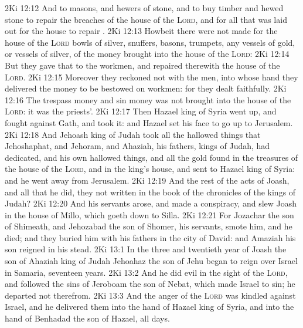 \vs 2Ki 12:12 And to masons, and hewers of stone, and to buy timber and hewed stone to repair the breaches of the house of the \textsc{Lord}, and for all that was laid out for the house to repair .
\vs 2Ki 12:13 Howbeit there were not made for the house of the \textsc{Lord} bowls of silver, snuffers, basons, trumpets, any vessels of gold, or vessels of silver, of the money  brought into the house of the \textsc{Lord}:
\vs 2Ki 12:14 But they gave that to the workmen, and repaired therewith the house of the \textsc{Lord}.
\vs 2Ki 12:15 Moreover they reckoned not with the men, into whose hand they delivered the money to be bestowed on workmen: for they dealt faithfully.
\vs 2Ki 12:16 The trespass money and sin money was not brought into the house of the \textsc{Lord}: it was the priests'.
\vs 2Ki 12:17 Then Hazael king of Syria went up, and fought against Gath, and took it: and Hazael set his face to go up to Jerusalem.
\vs 2Ki 12:18 And Jehoash king of Judah took all the hallowed things that Jehoshaphat, and Jehoram, and Ahaziah, his fathers, kings of Judah, had dedicated, and his own hallowed things, and all the gold  found in the treasures of the house of the \textsc{Lord}, and in the king's house, and sent  to Hazael king of Syria: and he went away from Jerusalem.
\vs 2Ki 12:19 And the rest of the acts of Joash, and all that he did,  they not written in the book of the chronicles of the kings of Judah?
\vs 2Ki 12:20 And his servants arose, and made a conspiracy, and slew Joash in the house of Millo, which goeth down to Silla.
\vs 2Ki 12:21 For Jozachar the son of Shimeath, and Jehozabad the son of Shomer, his servants, smote him, and he died; and they buried him with his fathers in the city of David: and Amaziah his son reigned in his stead.
\vs 2Ki 13:1 In the three and twentieth year of Joash the son of Ahaziah king of Judah Jehoahaz the son of Jehu began to reign over Israel in Samaria,  seventeen years.
\vs 2Ki 13:2 And he did  evil in the sight of the \textsc{Lord}, and followed the sins of Jeroboam the son of Nebat, which made Israel to sin; he departed not therefrom.
\vs 2Ki 13:3 And the anger of the \textsc{Lord} was kindled against Israel, and he delivered them into the hand of Hazael king of Syria, and into the hand of Benhadad the son of Hazael, all  days.
